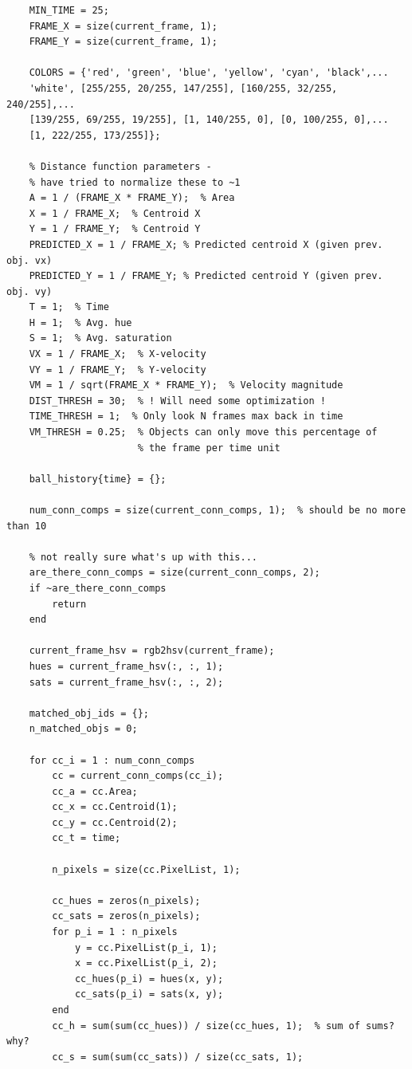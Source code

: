 \documentclass[12pt,a4paper]{article}
\begin{document}
\begin{appendices}
\begin{verbatim}
    MIN_TIME = 25;
    FRAME_X = size(current_frame, 1);
    FRAME_Y = size(current_frame, 1);
    
    COLORS = {'red', 'green', 'blue', 'yellow', 'cyan', 'black',...
    'white', [255/255, 20/255, 147/255], [160/255, 32/255, 240/255],...
    [139/255, 69/255, 19/255], [1, 140/255, 0], [0, 100/255, 0],...
    [1, 222/255, 173/255]};
    
    % Distance function parameters - 
    % have tried to normalize these to ~1 
    A = 1 / (FRAME_X * FRAME_Y);  % Area
    X = 1 / FRAME_X;  % Centroid X
    Y = 1 / FRAME_Y;  % Centroid Y
    PREDICTED_X = 1 / FRAME_X; % Predicted centroid X (given prev. obj. vx)
    PREDICTED_Y = 1 / FRAME_Y; % Predicted centroid Y (given prev. obj. vy)
    T = 1;  % Time
    H = 1;  % Avg. hue
    S = 1;  % Avg. saturation
    VX = 1 / FRAME_X;  % X-velocity
    VY = 1 / FRAME_Y;  % Y-velocity
    VM = 1 / sqrt(FRAME_X * FRAME_Y);  % Velocity magnitude
    DIST_THRESH = 30;  % ! Will need some optimization !
    TIME_THRESH = 1;  % Only look N frames max back in time
    VM_THRESH = 0.25;  % Objects can only move this percentage of 
                       % the frame per time unit
    
    ball_history{time} = {};
    
    num_conn_comps = size(current_conn_comps, 1);  % should be no more than 10
    
    % not really sure what's up with this... 
    are_there_conn_comps = size(current_conn_comps, 2);  
    if ~are_there_conn_comps
        return
    end
    
    current_frame_hsv = rgb2hsv(current_frame);
    hues = current_frame_hsv(:, :, 1);
    sats = current_frame_hsv(:, :, 2);
    
    matched_obj_ids = {};
    n_matched_objs = 0;
    
    for cc_i = 1 : num_conn_comps
        cc = current_conn_comps(cc_i);
        cc_a = cc.Area;
        cc_x = cc.Centroid(1);
        cc_y = cc.Centroid(2);
        cc_t = time;
        
        n_pixels = size(cc.PixelList, 1);
        
        cc_hues = zeros(n_pixels);
        cc_sats = zeros(n_pixels);
        for p_i = 1 : n_pixels
            y = cc.PixelList(p_i, 1);
            x = cc.PixelList(p_i, 2);
            cc_hues(p_i) = hues(x, y);
            cc_sats(p_i) = sats(x, y);
        end
        cc_h = sum(sum(cc_hues)) / size(cc_hues, 1);  % sum of sums? why?
        cc_s = sum(sum(cc_sats)) / size(cc_sats, 1);
                

\end{verbatim}
\end{appendices}
\end{document}
